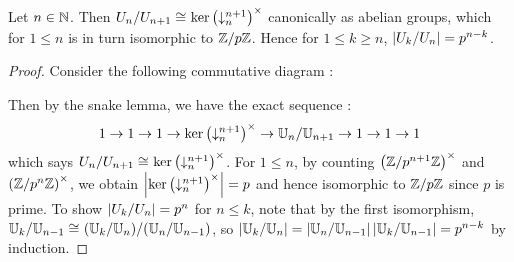 \begin{prop}
  
  Let $n \in \mathbb{N}$.
  Then $U_n / U_{n+1} \cong_{} \ker \left(\downarrow_{n}^{n+1}\right)^\times$
  canonically as abelian groups, 
  which for $1 \leq n$ is in turn isomorphic to $\mathbb{Z}/p\mathbb{Z}$. 
  Hence for $1 \leq k \geq n$, 
  $\left\vert U_k /U_n \right\vert = p^{n - k}$.
\end{prop}
\begin{proof}
  Consider the following commutative diagram : 
  \begin{figure}[H]
    \centering
  \end{figure}
  Then by the snake lemma, 
  we have the exact sequence : 
  \[1 \to 1 \to 1 \to \ker\left(\downarrow_{n}^{n+1}\right)^\times
  \to \mathbb{U}_n / \mathbb{U}_{n+1} \to 1 \to 1 \to 1 \]
  which says $U_n / U_{n+1} \cong_{} \ker \left(\downarrow_{n}^{n+1}\right)^\times$. 
  For $1 \leq n$, 
  by counting $\left(\mathbb{Z}/p^{n+1}\mathbb{Z}\right)^\times$ and $\left(\mathbb{Z}/p^n\mathbb{Z}\right)^\times$,
  we obtain $\left\vert \ker\left(\downarrow_{n}^{n+1}\right)^\times \right\vert = p$
  and hence isomorphic to $\mathbb{Z}/p\mathbb{Z}$ since $p$ is prime. 
  To show $\left\vert U_k/U_n \right\vert = p^n$ for $n \leq k$, 
  note that by the first isomorphism, 
  $\mathbb{U}_k / \mathbb{U}_{n-1} \cong_{} (\mathbb{U}_k / \mathbb{U}_{n}) / (\mathbb{U}_n / \mathbb{U}_{n-1})$,
  so $\left\vert \mathbb{U}_k / \mathbb{U}_{n} \right\vert = \left\vert \mathbb{U}_n / \mathbb{U}_{n-1} \right\vert \left\vert \mathbb{U}_k / \mathbb{U}_{n-1} \right\vert
  = p^{n - k}$ by induction. 
\end{proof}

